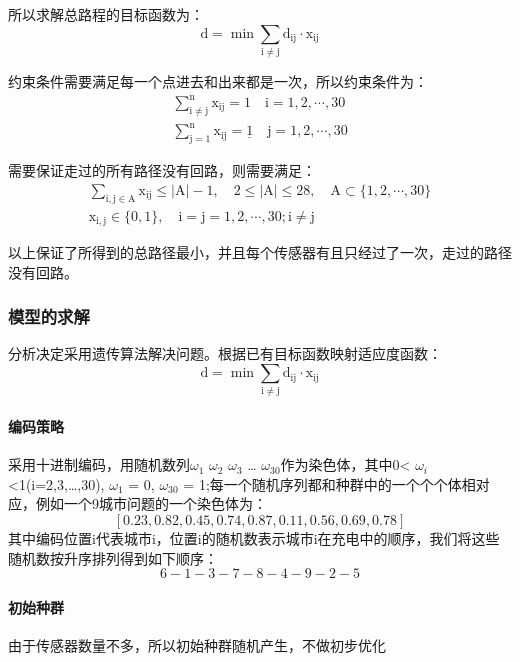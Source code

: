 \documentclass{article}
\begin{document}
所以求解总路程的目标函数为：
\begin{equation}
    \mathrm{d=\min \sum_{i \neq j} d_{i j} \cdot x_{i j}}
    \tag{7}
\end{equation}

约束条件需要满足每一个点进去和出来都是一次，所以约束条件为：
\begin{gather}    %
    \mathrm {\sum_{i \neq j}^{n} x_{i j}=1 \quad \mathrm{i}=1,2, \cdots, 30} \tag{8}\\
    \mathrm {\sum_{j=1}^{n} x_{i j}=\underline{1} \quad \mathrm{j}=1,2, \cdots, 30} \tag{9}           
\end{gather}    

需要保证走过的所有路径没有回路，则需要满足：
\begin{gather}    %
    \mathrm {\sum_{i, j \in A} x_{i j} \leqslant|A|-1, \quad 2 \leqslant |A| \leqslant 28,\quad A \subset \{1,2, \cdots, 30\}} \tag{10}\\
    \mathrm {x_{i , j} \in\{0,1\}, \quad i = j =1,2, \cdots, 30 ; \mathrm{i} \neq j} \tag{11}      
\end{gather} 

以上保证了所得到的总路径最小，并且每个传感器有且只经过了一次，走过的路径没有回路。

\subsubsection{模型的求解}
分析决定采用遗传算法解决问题。根据已有目标函数映射适应度函数：
$$\mathrm{d=\min \sum_{i \neq j} d_{i j} \cdot x_{i j}}$$

\paragraph{编码策略}
采用十进制编码，用随机数列$\omega_1$ $\omega_2$ $\omega_3$ … $\omega_{30}$作为染色体，其中0< $\omega_i$ <1(i=2,3,…,30), $\omega_1$ = 0, $\omega_{30}$ = 1;每一个随机序列都和种群中的一个个个体相对应，例如一个9城市问题的一个染色体为：
$$\left[0.23,0.82,0.45,0.74,0.87,0.11,0.56,0.69,0.78\right]$$
其中编码位置i代表城市i，位置i的随机数表示城市i在充电中的顺序，我们将这些随机数按升序排列得到如下顺序：
$$6-1-3-7-8-4-9-2-5$$

\paragraph{初始种群}
由于传感器数量不多，所以初始种群随机产生，不做初步优化
\end{document}
